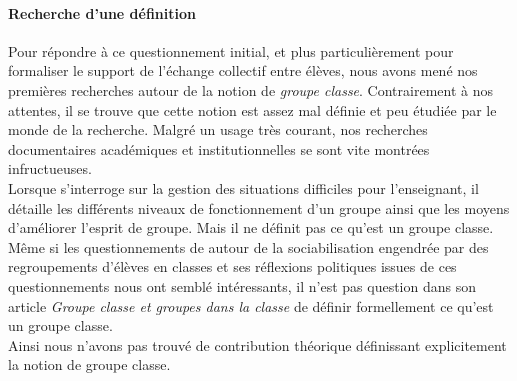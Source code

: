 \paragraph{Recherche d'une définition}
%
Pour répondre à ce questionnement initial, et plus particulièrement pour formaliser le support de l'échange collectif entre élèves, nous avons mené nos premières recherches autour de la notion de \emph{groupe classe}. Contrairement à nos attentes, il se trouve que cette notion est assez mal définie et peu étudiée par le monde de la recherche. Malgré un usage très courant, nos recherches documentaires académiques et institutionnelles se sont vite montrées infructueuses.
\\
Lorsque \cite{peeters_contribution_2018} s'interroge sur la gestion des situations difficiles pour l'enseignant, il détaille les différents niveaux de fonctionnement d'un groupe ainsi que les moyens d'améliorer l'esprit de groupe. Mais il ne définit pas ce qu'est un groupe classe.
%
Même si les questionnements de \cite{monceau_groupe_2005} autour de la sociabilisation engendrée par des regroupements d'élèves en classes et ses réflexions politiques issues de ces questionnements nous ont semblé intéressants, il n'est pas question dans son article \emph{Groupe classe et groupes dans la classe} de définir formellement ce qu'est un groupe classe.
%
\\
Ainsi nous n'avons pas trouvé de contribution théorique définissant explicitement la notion de groupe classe.


